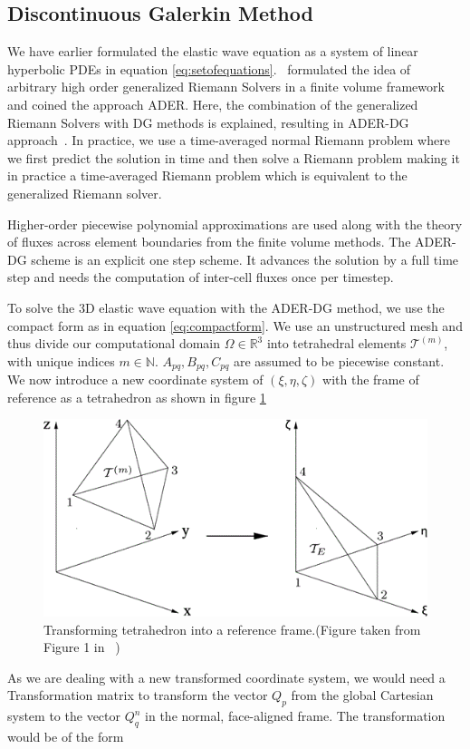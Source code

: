 \subsection[Discontinuous Galerkin method]{Discontinuous Galerkin Method}\label{subsection:DG}
We have earlier formulated the elastic wave equation as a system of linear hyperbolic \ac{PDE}s in equation \ref{eq:setofequations}.~
\parencite{Toro2001} formulated the idea of arbitrary high order generalized
Riemann Solvers in a finite volume framework and coined the approach \ac{ADER}. Here, the combination of the generalized Riemann Solvers with \ac{DG}
methods is explained, resulting in \ac{ADER}-\ac{DG} approach~\parencite{Dumbser2006}. In practice, we use a time-averaged normal Riemann problem where we first predict
the solution in time and then solve a Riemann problem making it in practice a time-averaged Riemann problem which is equivalent to the generalized Riemann solver.
\par Higher-order piecewise polynomial approximations are used
along with the theory of fluxes across element boundaries from the finite volume methods. The \ac{ADER}-\ac{DG} scheme is an explicit one step scheme.
It advances the solution by a full time step and needs the computation of inter-cell fluxes once per timestep.

To solve the 3D elastic wave equation with the \ac{ADER}-\ac{DG} method, we use the compact form as in equation \ref{eq:compactform}.
We use an unstructured mesh and thus divide our computational domain $\Omega \in \mathbb{R}^3$ into tetrahedral elements 
$\mathcal{T}^{\left(m\right)}$, with unique indices $m\in\mathbb{N}$. $A_{pq}, B_{pq}, C_{pq}$ are assumed to be piecewise constant. 
We now introduce a new coordinate system of $\left(\xi, \eta, \zeta \right)$ with the frame of reference as a tetrahedron as shown 
in figure \ref{fig:transformation} \\

\begin{figure}[!htpb]
    \centering
    \includegraphics[width=0.6\linewidth]{figures/m_167-1-319-fig001.png}
    \caption{Transforming tetrahedron into a reference frame.(Figure taken from Figure 1 in ~\parencite{dumbser1})}
    \label{fig:transformation}
\end{figure}
As we are dealing with a new transformed coordinate system, we would need a Transformation matrix to transform the vector $Q_p$
from the global Cartesian system to the vector $Q_q^n$ in the normal, face-aligned frame. The transformation would be of the form

